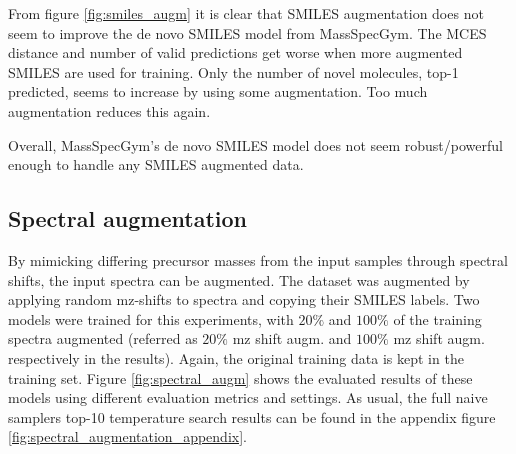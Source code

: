 From figure \ref{fig:smiles_augm} it is clear that SMILES augmentation does not seem to improve the de novo SMILES model from MassSpecGym.
The MCES distance and number of valid predictions get worse when more augmented SMILES are used for training.
Only the number of novel molecules, top-1 predicted, seems to increase by using some augmentation.
Too much augmentation reduces this again.

Overall, MassSpecGym's de novo SMILES model does not seem robust/powerful enough to handle any SMILES augmented data.

\subsection{Spectral augmentation}

By mimicking differing precursor masses from the input samples through spectral shifts, the input spectra can be augmented.
The dataset was augmented by applying random mz-shifts to spectra and copying their SMILES labels.
Two models were trained for this experiments, with $20\%$ and $100\%$ of the training spectra augmented (referred as $20\%$ mz shift augm. and $100\%$ mz shift augm. respectively in the results).
Again, the original training data is kept in the training set.
Figure \ref{fig:spectral_augm} shows the evaluated results of these models using different evaluation metrics and settings.
As usual, the full naive samplers top-10 temperature search results can be found in the appendix figure \ref{fig:spectral_augmentation_appendix}.

